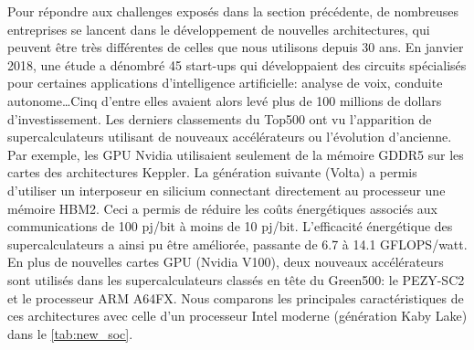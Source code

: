         Pour répondre aux challenges exposés dans la section précédente, de nombreuses entreprises se lancent dans le développement de nouvelles architectures, qui peuvent être très différentes de celles que nous utilisons depuis 30 ans. En janvier 2018, une étude \cite{Metz2018} a dénombré 45 start-ups qui développaient des circuits spécialisés pour certaines applications d’intelligence artificielle: analyse de voix, conduite autonome\ldots Cinq  d’entre elles avaient alors levé plus de 100 millions de dollars d’investissement. Les derniers classements du Top500 ont vu l'apparition de supercalculateurs utilisant de nouveaux accélérateurs ou l'évolution d'ancienne. Par exemple, les GPU Nvidia utilisaient seulement de la mémoire GDDR5 sur les cartes des architectures Keppler. La génération suivante (Volta) a permis d'utiliser un interposeur en silicium connectant directement au processeur une mémoire HBM2. Ceci a permis de réduire les coûts énergétiques associés aux communications de 100 pj/bit à moins de 10 pj/bit. L'efficacité énergétique des supercalculateurs a ainsi pu être améliorée, passante de 6.7 à 14.1 GFLOPS/watt. En plus de nouvelles cartes GPU (Nvidia V100), deux nouveaux accélérateurs sont utilisés dans les supercalculateurs classés en tête du Green500: le PEZY-SC2 et le processeur ARM A64FX. Nous comparons les principales caractéristiques de ces architectures avec celle d'un processeur Intel moderne (génération Kaby Lake) dans le \autoref{tab:new_soc}.
        
                
        \begin{table}[]
        \centering
        \caption{Caractéristiques et performances d'architectures utilisées dans les supercalculateurs les plus efficaces du Top500.}
        \label{tab:new_soc}
        \end{table}
                
